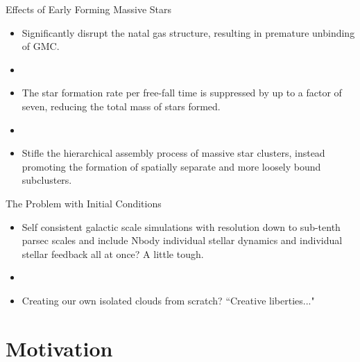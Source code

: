 \documentclass[aspectratio=169]{beamer}
\begin{document}
\begin{frame}{Effects of Early Forming Massive Stars}{}
    \begin{itemize}
        \item Significantly disrupt the natal gas structure, resulting in premature unbinding of GMC.
        \item []
        \item The star formation rate per free-fall time is suppressed by up to a factor of seven, reducing the total mass of stars formed.
        \item []
        \item Stifle the hierarchical assembly process of massive star clusters, instead promoting the formation of spatially separate and more loosely bound subclusters.
    \end{itemize}
\end{frame}
%
%
%
%
% 
\begin{frame}{The Problem with Initial Conditions}{}
    \begin{itemize}
        \item Self consistent galactic scale simulations with resolution down to sub-tenth parsec scales and include Nbody individual stellar dynamics and individual stellar feedback all at once? A little tough.
        \item []
        \item Creating our own isolated clouds from scratch? ``Creative liberties..."
    \end{itemize}
\end{frame}
%
%
%
\section{Motivation}
%
%
%
%
%
%
%
\end{document}
